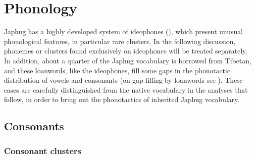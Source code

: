 \chapter{Phonology} \label{sec:phonology}

  

 Japhug has a highly  developed system of ideophones (\citealt{japhug14ideophones}), which present unusual phonological features, in particular rare clusters. In the following discussion, phonemes or clusters found exclusively on  ideophones will be treated separately. In addition, about a quarter of the Japhug vocabulary is borrowed from Tibetan, and these loanwords, like the ideophones, fill some gaps in the phonotactic distribution of vowels and consonants (on gap-filling by loanwords see \citealt[63-64]{martinet05economie}).  These cases are carefully distinguished from the native vocabulary in the analyses that follow, in order to bring out the phonotactics of inherited Japhug vocabulary.


\section{Consonants}

\subsection{Consonant clusters}


